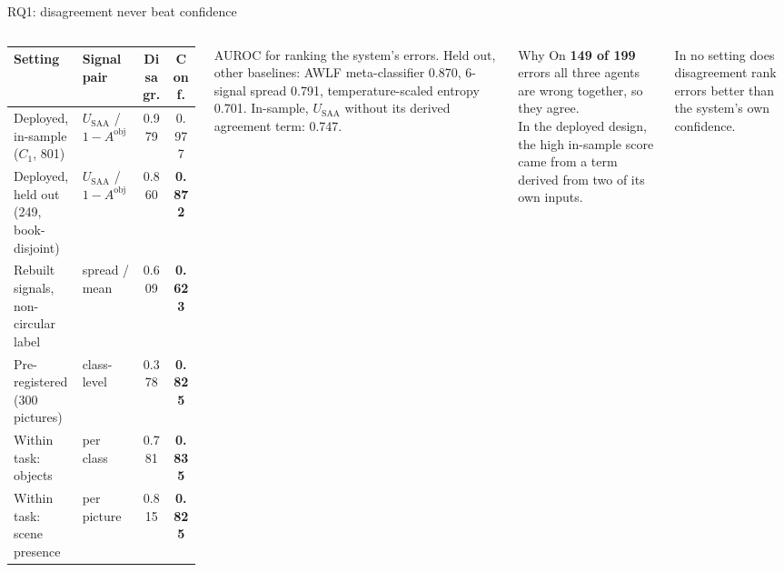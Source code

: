 \documentclass[aspectratio=169,10pt]{beamer}
\begin{document}
\begin{frame}{RQ1: disagreement never beat confidence}
\begin{columns}[T,onlytextwidth]
\footnotesize\renewcommand{\arraystretch}{1.18}
\begin{tabular}{@{}>{\raggedright\arraybackslash}p{3.3cm} >{\raggedright\arraybackslash}p{1.9cm} c c@{}}
\toprule
Setting & Signal pair & Disagr. & Conf.\\
\midrule
Deployed, in-sample ($C_1$, 801) & $U_{\text{SAA}}$ / $1-A^{\text{obj}}$ & 0.979 & 0.977\\
Deployed, held out (249, book-disjoint) & $U_{\text{SAA}}$ / $1-A^{\text{obj}}$ & 0.860 & \textbf{0.872}\\
Rebuilt signals, non-circular label & spread / mean & 0.609 & \textbf{0.623}\\
Pre-registered (300 pictures) & class-level & 0.378 & \textbf{0.825}\\
Within task: objects & per class & 0.781 & \textbf{0.835}\\
Within task: scene presence & per picture & 0.815 & \textbf{0.825}\\
\bottomrule
\end{tabular}\par\vspace{3pt}
{\scriptsize\color{muted}AUROC for ranking the system's errors. Held out, other baselines: AWLF meta-classifier 0.870, 6-signal spread 0.791, temperature-scaled entropy 0.701. In-sample, $U_{\text{SAA}}$ without its derived agreement term: 0.747.}
\begin{defbox}{Why}
On \textbf{149 of 199} errors all three agents are wrong together, so they agree.\\[2pt]
In the deployed design, the high in-sample score came from a term derived from two of its own inputs.
\end{defbox}\vspace{3pt}
\begin{keybox}[fontupper=\scriptsize\raggedright]
In no setting does disagreement rank errors better than the system's own confidence.
\end{keybox}
\end{columns}
\end{frame}
\end{document}
